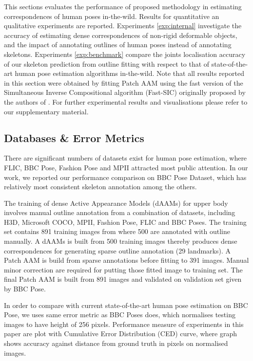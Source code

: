 This sections evaluates the performance of proposed methodology in estimating correspondences of human poses in-the-wild. Results for quantitative an qualitative experiments are reported. Experiments \ref{exp:internal} investigate the accuracy of estimating dense correspondences of non-rigid deformable objects, and the impact of annotating outlines of human poses instead of annotating skeletons. Experiments \ref{exp:benchmark} compare the joints localisation accuracy of our skeleton prediction from outline fitting with respect to that of state-of-the-art human pose estimation algorithms in-the-wild. Note that all results reported in this section were obtained by fitting Patch AAM using the fast version of the Simultaneous Inverse Compositional algorithm (Fast-SIC) originally proposed by the authors of \cite{Papandreou2008}. For further experimental results and visualisations please refer to our supplementary material.

\subsection{Databases \& Error Metrics}
There are significant numbers of datasets exist for human pose estimation, where FLIC\cite{sapp2013modec}, BBC Pose\cite{pfister2015flowing}, Fashion Pose\cite{dantone2013human} and MPII\cite{andriluka14cvpr} attracted most public attention. In our work, we reported our performance comparison on BBC Pose Dataset\cite{pfister2015flowing}, which has relatively most consistent skeleton annotation among the others.

The training of dense Active Appearance Models (dAAMs) for upper body involves manual outline annotation from a combination of datasets, including H3D\cite{PoseletsICCV09}, Microsoft COCO\cite{lin2014microsoft}, MPII\cite{andriluka14cvpr}, Fashion Pose\cite{dantone2013human}, FLIC\cite{sapp2013modec} and BBC Poses\cite{pfister2015flowing}. The training set contains 891 training images from where 500 are annotated with outline manually. A dAAMs is built from 500 training images thereby produces dense correspondences for generating sparse outline annotation (29 landmarks). A Patch AAM is build from sparse annotations before fitting to 391 images. Manual minor correction are required for putting those fitted image to training set. The final Patch AAM is built from 891 images and validated on validation set given by BBC Pose.

In order to compare with current state-of-the-art human pose estimation on BBC Pose, we uses same error metric as BBC Poses does, which normalises testing images to have height of 256 pixels. Performance measure of experiments in this paper are plot with Cumulative Error Distribution (CED) curve, where graph shows accuracy against distance from ground truth in pixels on normalised images.

